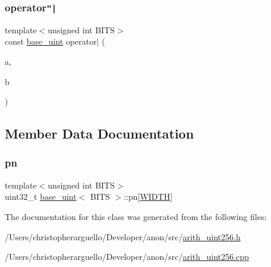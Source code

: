 \subsubsection{\texorpdfstring{operator\texttt{"|}}{operator|}}
{\footnotesize\ttfamily template$<$unsigned int B\+I\+TS$>$ \\
const \mbox{\hyperlink{classbase__uint}{base\+\_\+uint}} operator$\vert$ (\begin{DoxyParamCaption}\item[{const \mbox{\hyperlink{classbase__uint}{base\+\_\+uint}}$<$ B\+I\+TS $>$ \&}]{a,  }\item[{const \mbox{\hyperlink{classbase__uint}{base\+\_\+uint}}$<$ B\+I\+TS $>$ \&}]{b }\end{DoxyParamCaption})\hspace{0.3cm}{\ttfamily [friend]}}



\subsection{Member Data Documentation}
\mbox{\label{classbase__uint_a0edb1465d540fadd92b21659f27083a2}} 
\subsubsection{\texorpdfstring{pn}{pn}}
{\footnotesize\ttfamily template$<$unsigned int B\+I\+TS$>$ \\
uint32\+\_\+t \mbox{\hyperlink{classbase__uint}{base\+\_\+uint}}$<$ B\+I\+TS $>$\+::pn\mbox{[}\mbox{\hyperlink{classbase__uint_afee51629f03ba95d823ab4ee94cf6c81adf579395d753e2d9607ecd61424f0853}{W\+I\+D\+TH}}\mbox{]}\hspace{0.3cm}{\ttfamily [protected]}}



The documentation for this class was generated from the following files\+:\begin{DoxyCompactItemize}
\item 
/\+Users/christopherarguello/\+Developer/anon/src/\mbox{\hyperlink{arith__uint256_8h}{arith\+\_\+uint256.\+h}}\item 
/\+Users/christopherarguello/\+Developer/anon/src/\mbox{\hyperlink{arith__uint256_8cpp}{arith\+\_\+uint256.\+cpp}}\end{DoxyCompactItemize}

